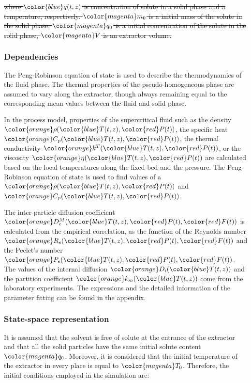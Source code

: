 \documentclass[a4paper,fleqn]{cas-dc}
\begin{document}
\sout{where ${\color{blue}q}(t,z)$ is concentration of solute in a solid phase and a temperature, respectively. ${\color{magenta}m_0}$ is a initial mass of the solute in the solid phase, ${\color{magenta}q_0}$ is a  initial concentration of the solute in the solid phase, ${\color{magenta}V}$ is an extractor volume.}
	
\subsubsection{Dependencies} \label{CH: Dependencies}
{\color{blue}The Peng-Robinson equation of state is used to describe the thermodynamics of the fluid phase. The thermal properties of the pseudo-homogeneous phase are assumed to vary along the extractor, though always remaining equal to the corresponding mean values between the fluid and solid phase. }

In the process model, properties of the supercritical fluid such as the density ${\color{orange}\rho} ({\color{blue}T}(t,z),{\color{red}P}(t))$, the specific heat ${\color{orange}C_p}({\color{blue}T}(t,z),{\color{red}P}(t))$, the thermal conductivity ${\color{orange}k^T}({\color{blue}T}(t,z),{\color{red}P}(t))$, or the viscosity ${\color{orange}\eta}({\color{blue}T}(t,z),{\color{red}P}(t))$ are calculated based on the local temperatures along the fixed bed and the pressure. The Peng-Robinson equation of state is used to find values of a ${\color{orange}\rho} ({\color{blue}T}(t,z),{\color{red}P}(t))$ and ${\color{orange}C_p}({\color{blue}T}(t,z),{\color{red}P}(t))$.

The inter-particle diffusion coefficient ${\color{orange}D^M_e}(\allowbreak{\color{blue}T}(t,z),{\color{red}P}(t),{\color{red}F}(t))$ is calculated from the empirical correlation, as the function of the Reynolds number ${\color{orange}R_e}({\color{blue}T}(t,z),{\color{red}P}(t),\allowbreak{\color{red}F}(t))$ and the Peclet's number ${\color{orange}P_e}({\color{blue}T}(t,z),\allowbreak{\color{red}P}(t),{\color{red}F}(t))$.
The values of the internal diffusion ${\color{orange}D_i} ({\color{blue}T}(t,z))$ and the partition coefficient ${\color{orange}k_m} ({\color{blue}T}(t,z))$ come from the laboratory experiments. The expressions and the detailed information of the parameter fitting can be found in the appendix.

\subsubsection{State-space representation} \label{CH: State_space}
It is assumed that the solvent is free of solute at the entrance of the extractor and that all the solid particles have the same initial solute content ${\color{magenta}q_0}$. Moreover, it is considered that the initial temperature of the extractor in every place is equal to ${\color{magenta}T_0}$. Therefore, the initial conditions employed in the simulation are:
\end{document}
